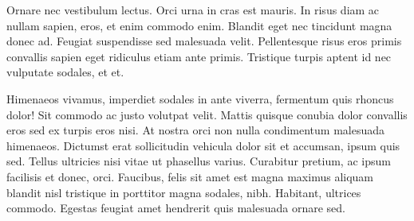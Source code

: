 \documentclass[12pt,spanish,a4paper,]{article}
\begin{document}
Ornare nec vestibulum lectus. Orci urna in cras est mauris. In risus diam ac nullam sapien, eros, et enim commodo enim. Blandit eget nec tincidunt magna donec ad. Feugiat suspendisse sed malesuada velit. Pellentesque risus eros primis convallis sapien eget ridiculus etiam ante primis. Tristique turpis aptent id nec vulputate sodales, et et.

Himenaeos vivamus, imperdiet sodales in ante viverra, fermentum quis rhoncus dolor! Sit commodo ac justo volutpat velit. Mattis quisque conubia dolor convallis eros sed ex turpis eros nisi. At nostra orci non nulla condimentum malesuada himenaeos. Dictumst erat sollicitudin vehicula dolor sit et accumsan, ipsum quis sed. Tellus ultricies nisi vitae ut phasellus varius. Curabitur pretium, ac ipsum facilisis et donec, orci. Faucibus, felis sit amet est magna maximus aliquam blandit nisl tristique in porttitor magna sodales, nibh. Habitant, ultrices commodo. Egestas feugiat amet hendrerit quis malesuada ornare sed.

\newpage
\printbibliography
\end{document}

